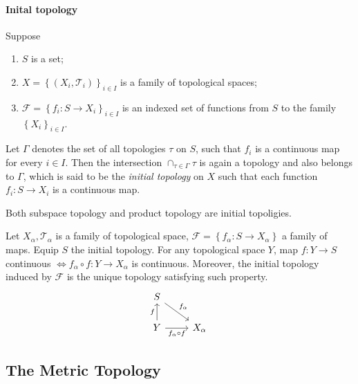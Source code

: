 \paragraph{Inital topology}
\begin{definition}
  Suppose
  \begin{enumerate}
    \item \( S \) is a set;
    \item \( X = \left\lbrace (X_i, \mathcal{T}_i) \right\rbrace_{i \in I} \) is a family of topological spaces;
    \item \( \mathcal{F} = \left\lbrace f_i: S \to X_i \right\rbrace_{i \in I} \) is an indexed set of functions from \( S \) to the family \( \left\lbrace X_i \right\rbrace_{i \in I} \).
  \end{enumerate}
  Let \( \Gamma \) denotes the set of all topologies \( \mathcal{\tau} \) on \( S \), such that \( f_i \) is a continuous map for every \( i \in I \).
  Then the intersection \( \cap_{\tau \in \Gamma} \tau \) is again a topology and also belongs to \( \Gamma \), which is said to be the \emph{initial topology} on \( X \) such that each function \( f_i: S \to X_i \) is a continuous map.
\end{definition}
 
\begin{example}
  Both subspace topology and product topology are initial topoligies.
\end{example}

\begin{theorem}
  Let \( X_\alpha, \mathcal{T}_\alpha \) is a family of topological space, \( \mathcal{F} = \left\lbrace f_\alpha: S \to X_\alpha \right\rbrace \) a family of maps.
  Equip \( S \) the initial topology.
  For any topological space \( Y \), map \( f: Y \to S \) continuous \( \iff f_\alpha \circ f: Y \to X_\alpha \) is continuous.
  Moreover, the initial topology induced by \( \mathcal{F} \) is the unique topology satisfying such property.
  \[\begin{tikzcd}
    S \\
    Y & {X_\alpha}
    \arrow["f", from=2-1, to=1-1]
    \arrow["{f_\alpha}", from=1-1, to=2-2]
    \arrow["{f_\alpha \circ f}"', from=2-1, to=2-2]
  \end{tikzcd}\]
\end{theorem}

\subsection{The Metric Topology}


